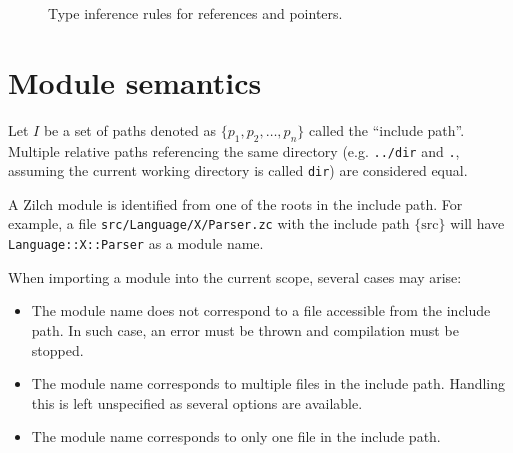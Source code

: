 \begin{figure}[H]

	\caption{Type inference rules for references and pointers.}
	\label{fig:zilch-staticsem-exprs-atoms-ptrrefs-typerules}
\end{figure}

\section{Module semantics}\label{sec:zilch-staticsem-modules}

Let $I$ be a set of paths denoted as $\{ p_1, p_2, \ldots, p_n \}$ called the ``include path''.
Multiple relative paths referencing the same directory (e.g. \verb|../dir| and \verb|.|, assuming the current working directory is called \verb|dir|) are considered equal.

A Zilch module is identified from one of the roots in the include path.
For example, a file \verb|src/Language/X/Parser.zc| with the include path $\{ \text{src} \}$ will have \verb|Language::X::Parser| as a module name.

When importing a module into the current scope, several cases may arise:
\begin{itemize}
	\item The module name does not correspond to a file accessible from the include path.
	      In such case, an error must be thrown and compilation must be stopped.
	\item The module name corresponds to multiple files in the include path.
	      Handling this is left unspecified as several options are available.
	\item The module name corresponds to only one file in the include path.
\end{itemize}

